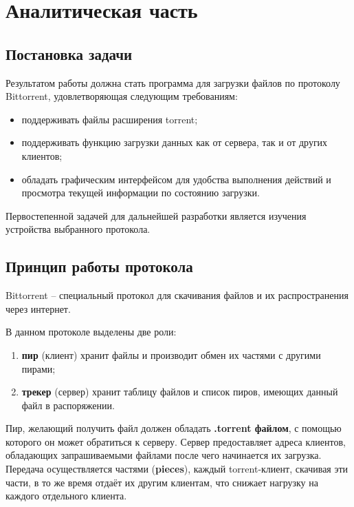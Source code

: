 \section{Аналитическая часть}

\subsection{Постановка задачи}
Результатом работы должна стать программа для загрузки файлов по протоколу Bittorrent, удовлетворяющая следующим требованиям:
\begin{itemize}
	\item поддерживать файлы расширения torrent;
	
	\item поддерживать функцию загрузки данных как от сервера, так и от других клиентов;
	
	\item обладать графическим интерфейсом для удобства выполнения действий и просмотра текущей информации по состоянию загрузки.
	
\end{itemize}

Первостепенной задачей для дальнейшей разработки является изучения устройства выбранного протокола. \newline

\subsection{Принцип работы протокола}
Bittorrent -- специальный протокол для скачивания файлов и их распространения через интернет. 

В данном протоколе выделены две роли:
\begin{enumerate}
	\item \textbf{пир} (клиент) хранит файлы и производит обмен их частями с другими пирами;
	
	\item \textbf{трекер} (сервер) хранит таблицу файлов и список пиров, имеющих данный файл в распоряжении.
\end{enumerate}

Пир, желающий получить файл должен обладать \textbf{.torrent файлом}, с помощью которого он может обратиться к серверу. Сервер предоставляет адреса клиентов, обладающих запрашиваемыми файлами после чего начинается их загрузка. Передача осуществляется частями (\textbf{pieces}), каждый torrent-клиент, скачивая эти части, в то же время отдаёт их другим клиентам, что снижает нагрузку на каждого отдельного клиента. \newline

